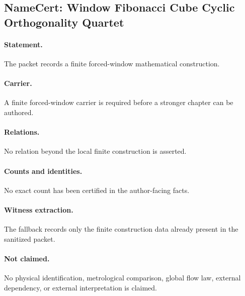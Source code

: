 \subsection{NameCert: Window Fibonacci Cube Cyclic Orthogonality Quartet}
\label{sec:namecert-window_fibonacci_cube_cyclic_orthogonality_quartet_certificate}

\paragraph{Statement.} The packet records a finite forced-window mathematical construction.

\paragraph{Carrier.} A finite forced-window carrier is required before a stronger chapter can be authored.

\paragraph{Relations.} No relation beyond the local finite construction is asserted.

\paragraph{Counts and identities.} No exact count has been certified in the author-facing facts.

\paragraph{Witness extraction.} The fallback records only the finite construction data already present in the sanitized packet.

\paragraph{Not claimed.} No physical identification, metrological comparison, global flow law, external dependency, or external interpretation is claimed.
